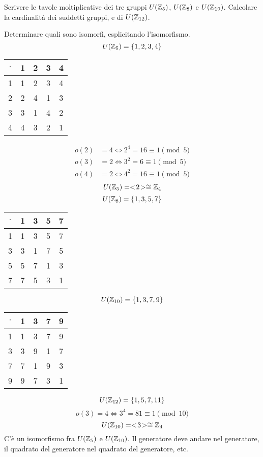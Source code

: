 \begin{exmp}
Scrivere le tavole moltiplicative dei tre gruppi $U(\mathbb{Z}_5)$, $U(\mathbb{Z}_8)$ e $U(\mathbb{Z}_{10})$. Calcolare la cardinalit\`a dei suddetti gruppi, e di $U(\mathbb{Z}_{12})$.

Determinare quali sono isomorfi, esplicitando l'isomorfismo.
\[
U(\mathbb{Z}_5) = \{ 1, 2, 3, 4 \}
\]
\begin{table}[ht]
\centering
\begin{tabular}{c|*{4}{c}}
$\cdot$ & 1 & 2 & 3 & 4 \\
\hline
1 & 1 & 2 & 3 & 4 \\
2 & 2 & 4 & 1 & 3 \\
3 & 3 & 1 & 4 & 2 \\
4 & 4 & 3 & 2 & 1
\end{tabular}
\end{table}
\begin{align*}
o(2) &= 4 \iff 2^4 = 16 \equiv 1 \pmod{5} \\
o(3) &= 2 \iff 3^2 = 6 \equiv 1 \pmod{5} \\
o(4) &= 2 \iff 4^2 = 16 \equiv 1 \pmod{5}
\end{align*}
\[
U(\mathbb{Z}_5) = <\!{2}\!> \cong \mathbb{Z}_4
\]
\[
U(\mathbb{Z}_8) = \{ 1, 3, 5, 7 \}
\]
\begin{table}[ht]
\centering
\begin{tabular}{c|*{4}{c}}
$\cdot$ & 1 & 3 & 5 & 7 \\
\hline
1 & 1 & 3 & 5 & 7 \\
3 & 3 & 1 & 7 & 5 \\
5 & 5 & 7 & 1 & 3 \\
7 & 7 & 5 & 3 & 1
\end{tabular}
\end{table}
\[
U(\mathbb{Z}_{10}) = \{ 1, 3, 7, 9 \}
\]
\begin{table}[ht]
\centering
\begin{tabular}{c|*{4}{c}}
$\cdot$ & 1 & 3 & 7 & 9 \\
\hline
1 & 1 & 3 & 7 & 9 \\
3 & 3 & 9 & 1 & 7 \\
7 & 7 & 1 & 9 & 3 \\
9 & 9 & 7 & 3 & 1
\end{tabular}
\end{table}
\[
U(\mathbb{Z}_{12}) = \{ 1, 5, 7, 11 \}
\]
\[
o(3) = 4 \iff 3^4 = 81 \equiv 1 \pmod{10}
\]
\[
U(\mathbb{Z}_{10}) = <\!{3}\!> \cong \mathbb{Z}_4
\]
C'\`e un isomorfismo fra $U(\mathbb{Z}_5)$ e $U(\mathbb{Z}_{10})$. Il generatore deve andare nel generatore, il quadrato del generatore nel quadrato del generatore, etc.


\end{exmp}
